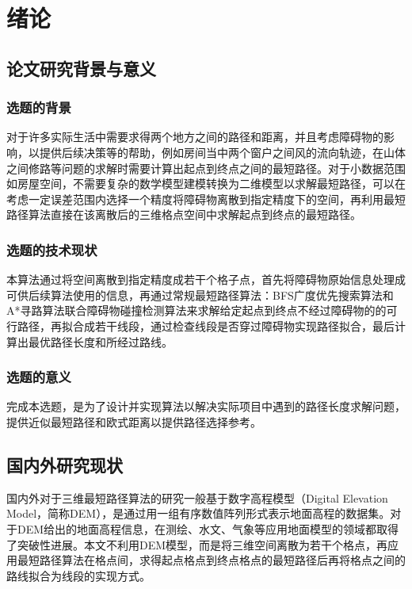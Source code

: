\setcounter{table}{0}
\setcounter{figure}{0}
\section{绪论}
 
\subsection{论文研究背景与意义}
\subsubsection{选题的背景}
\par 对于许多实际生活中需要求得两个地方之间的路径和距离，并且考虑障碍物的影响，以提供后续决策等的帮助，例如房间当中两个窗户之间风的流向轨迹，在山体之间修路等问题的求解时需要计算出起点到终点之间的最短路径。对于小数据范围如房屋空间，不需要复杂的数学模型建模转换为二维模型以求解最短路径，可以在考虑一定误差范围内选择一个精度将障碍物离散到指定精度下的空间，再利用最短路径算法直接在该离散后的三维格点空间中求解起点到终点的最短路径。
\subsubsection{选题的技术现状}
\par 本算法通过将空间离散到指定精度成若干个格子点，首先将障碍物原始信息处理成可供后续算法使用的信息，再通过常规最短路径算法：BFS广度优先搜索算法和A*寻路算法联合障碍物碰撞检测算法来求解给定起点到终点不经过障碍物的的可行路径，再拟合成若干线段，通过检查线段是否穿过障碍物实现路径拟合，最后计算出最优路径长度和所经过路线。
\subsubsection{选题的意义}
\par 完成本选题，是为了设计并实现算法以解决实际项目中遇到的路径长度求解问题，提供近似最短路径和欧式距离以提供路径选择参考。
\subsection{国内外研究现状}
\par 国内外对于三维最短路径算法的研究一般基于数字高程模型（Digital Elevation Model，简称DEM），是通过用一组有序数值阵列形式表示地面高程的数据集。对于DEM给出的地面高程信息，在测绘、水文、气象等应用地面模型的领域都取得了突破性进展。本文不利用DEM模型，而是将三维空间离散为若干个格点，再应用最短路径算法在格点间，求得起点格点到终点格点的最短路径后再将格点之间的路线拟合为线段的实现方式。
